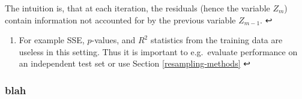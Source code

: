 \documentclass[11pt]{article}
\providecommand{\tightlist}{%
      \setlength{\itemsep}{0pt}\setlength{\parskip}{0pt}}
\begin{document}
The intuition is, that at each iteration, the residuals (hence the
variable \(Z_m\)) contain information not accounted for by the previous
variable \(Z_{m - 1}\). ↩

\hypertarget{foot53}{}
\begin{enumerate}
\def\labelenumi{\arabic{enumi}.}
\setcounter{enumi}{52}
\tightlist
\item
  For example SSE, \(p\)-values, and \(R^2\) statistics from the
  training data are useless in this setting. Thus it is important to
  e.g.~evaluate performance on an independent test set or use
  Section \ref{resampling-methods} ↩
\end{enumerate}

    \hypertarget{blah}{%
\subsubsection{blah}\label{blah}}


    
    
    
    
\end{document}
